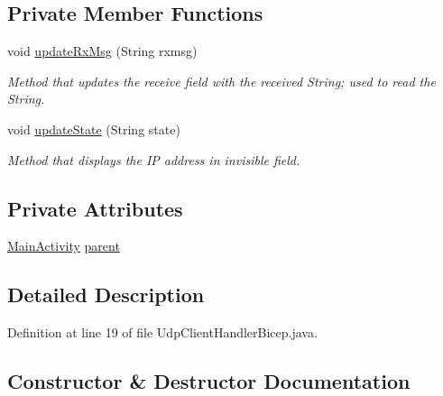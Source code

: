 \subsection*{Private Member Functions}
\begin{DoxyCompactItemize}
\item 
void \mbox{\hyperlink{classcom_1_1example_1_1trainawearapplication_1_1_udp_client_handler_bicep_a1f7d4b7fa7229fe47c39dff0b6dec3a2}{update\+Rx\+Msg}} (String rxmsg)
\begin{DoxyCompactList}\small\item\em Method that updates the receive field with the received String; used to read the String. \end{DoxyCompactList}\item 
void \mbox{\hyperlink{classcom_1_1example_1_1trainawearapplication_1_1_udp_client_handler_bicep_aaf087b8a72f9ea8baf46baca6dc4cdc1}{update\+State}} (String state)
\begin{DoxyCompactList}\small\item\em Method that displays the IP address in invisible field. \end{DoxyCompactList}\end{DoxyCompactItemize}
\subsection*{Private Attributes}
\begin{DoxyCompactItemize}
\item 
\mbox{\hyperlink{classcom_1_1example_1_1trainawearapplication_1_1_main_activity}{Main\+Activity}} \mbox{\hyperlink{classcom_1_1example_1_1trainawearapplication_1_1_udp_client_handler_bicep_a0b203f16a962458064aebb68efbd72bb}{parent}}
\end{DoxyCompactItemize}


\subsection{Detailed Description}


Definition at line 19 of file Udp\+Client\+Handler\+Bicep.\+java.



\subsection{Constructor \& Destructor Documentation}
\mbox{\label{classcom_1_1example_1_1trainawearapplication_1_1_udp_client_handler_bicep_afa5c7cacbf23c1527423e8bf7c22abe1}} 

